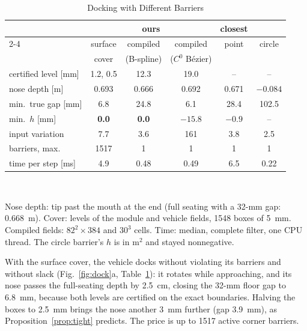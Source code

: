 \documentclass[journal]{IEEEtran}
\theoremstyle{definition}
\begin{document}
\begin{table}[t]
\caption{Docking with Different Barriers}
\label{tab:dock-base}
\centering
\footnotesize
\setlength{\tabcolsep}{1.6pt}
\renewcommand{\arraystretch}{1.05}
\begin{tabular}{lccccc}
\toprule
& \multicolumn{3}{c}{ours} & closest & \\
\cmidrule(lr){2-4}
& surface & compiled & compiled & point & circle\\
& cover & (B-spline) & ($C^0$ B\'ezier) & & \\
\midrule
certified level [mm] & 1.2, 0.5 & 12.3 & 19.0 & -- & --\\
nose depth [m] & 0.693 & 0.666 & 0.692 & 0.671 & $-0.084$\\
min.\ true gap [mm] & 6.8 & 24.8 & 6.1 & 28.4 & 102.5\\
min.\ $h$ [mm] & \textbf{0.0} & \textbf{0.0} & $-15.8$ & $-0.9$ & --\\
input variation & 7.7 & 3.6 & 161 & 3.8 & 2.5\\
barriers, max. & 1517 & 1 & 1 & 1 & 1\\
time per step [ms] & 4.9 & 0.48 & 0.49 & 6.5 & 0.22\\
\bottomrule
\end{tabular}
\\[3pt]
\parbox{\columnwidth}{\footnotesize Nose depth: tip past the mouth at the end (full seating with a
32-mm gap: 0.668~m). Cover: levels of the module and vehicle fields, 1548 boxes of 5~mm. Compiled
fields: $82^2{\times}384$ and $30^3$ cells. Time: median, complete filter, one CPU thread. The circle
barrier's $h$ is in m$^2$ and stayed nonnegative.}
\end{table}

With the surface cover, the vehicle docks without violating its barriers and without slack
(Fig.~\ref{fig:dock}a, Table~\ref{tab:dock-base}): it rotates while approaching, and its nose passes
the full-seating depth by 2.5~cm, closing the 32-mm floor gap to 6.8~mm, because both levels are
certified on the exact boundaries. Halving the boxes to 2.5~mm brings the nose another 3~mm further
(gap 3.9~mm), as Proposition~\ref{prop:tight} predicts. The price is up to 1517 active corner
barriers.
\end{document}
